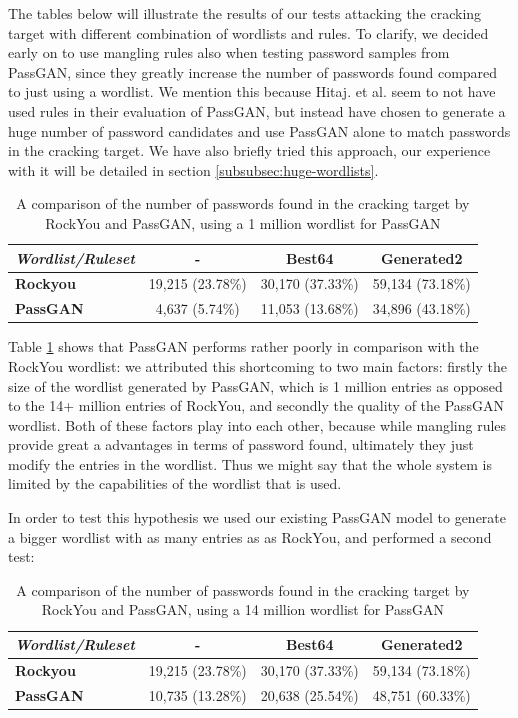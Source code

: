 The tables below will illustrate the results of our tests attacking the cracking target with different combination of wordlists and rules. To clarify, we decided early on to use mangling rules also when testing password samples from PassGAN, since they greatly increase the number of passwords found compared to just using a wordlist. 
We mention this because Hitaj. et al. seem to not have used rules in their evaluation of PassGAN, but instead have chosen to generate a huge number of password candidates and use PassGAN alone to match passwords in the cracking target. We have also briefly tried this approach, our experience with it will be detailed in section \ref{subsubsec:huge-wordlists}.

\begin{table}[H]
\begin{tabular}{|l|c|c|c|}
\hline
\textbf{\emph{Wordlist/Ruleset}} & \textbf{-} & \textbf{Best64} & \textbf{Generated2} \\ \hline
\textbf{Rockyou}          & 19,215 (23.78\%) & 30,170 (37.33\%) & 59,134 (73.18\%) \\ \hline
\textbf{PassGAN}          & 4,637 (5.74\%) & 11,053 (13.68\%) & 34,896 (43.18\%) \\ \hline
\end{tabular}
\caption{A comparison of the number of passwords found in the cracking target by RockYou and PassGAN,  using a 1 million wordlist for PassGAN}
\label{tab:test-set}
\wfill
\hfill
\end{table}

Table \ref{tab:test-set} shows that PassGAN performs rather poorly in comparison with the RockYou wordlist: we attributed this shortcoming to two main factors: firstly the size of the wordlist generated by PassGAN, which is 1 million entries as opposed to the 14+ million entries of RockYou, and secondly the quality of the PassGAN wordlist. Both of these factors play into each other, because while mangling rules provide great a advantages in terms of password found, ultimately they just modify the entries in the wordlist. Thus we might say that the whole system is limited by the capabilities of the wordlist that is used.

In order to test this hypothesis we used our existing PassGAN model to generate a bigger wordlist with as many entries as as RockYou, and performed a second test:
\begin{table}[H]
\centering    
\begin{tabular}{|l|c|c|c|}
\hline
\textbf{\emph{Wordlist/Ruleset}} & \textbf{-} & \textbf{Best64} & \textbf{Generated2} \\ \hline
\textbf{Rockyou}          & 19,215 (23.78\%) & 30,170 (37.33\%) & 59,134 (73.18\%) \\ \hline
\textbf{PassGAN}          &  10,735 (13.28\%) & 20,638 (25.54\%) & 48,751 (60.33\%) \\ \hline
\end{tabular}
\caption{A comparison of the number of passwords found in the cracking target by RockYou and PassGAN, using a 14 million wordlist for PassGAN} 
\label{tab:passgan-big}
\end{table}

